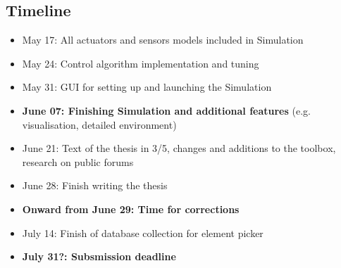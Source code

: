 \subsection*{Timeline}
\begin{itemize}
    \item May 17: All actuators and sensors models included in Simulation
    \item May 24: Control algorithm implementation and tuning
    \item May 31: GUI for setting up and launching the Simulation
    \item \textbf{June 07: Finishing Simulation and additional features} (e.g. visualisation, detailed environment)
    \item June 21: Text of the thesis in 3/5, changes and additions to the toolbox, research on public forums
    \item June 28: Finish writing the thesis
    \item \textbf{Onward from June 29: Time for corrections}
    \item July 14: Finish of database collection for element picker
    \item \textbf{July 31?: Subsmission deadline}
\end{itemize}